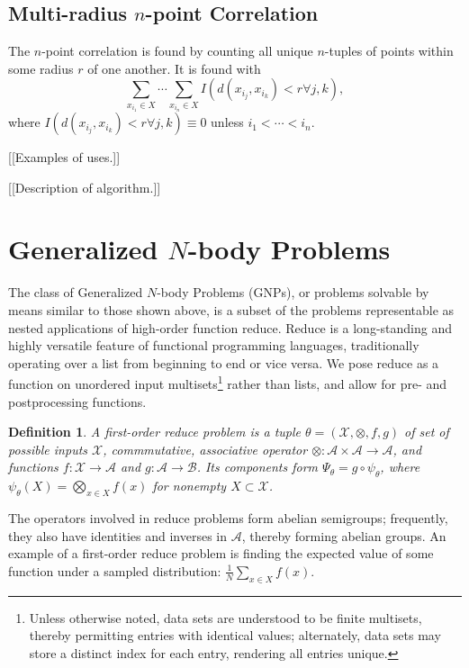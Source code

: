 \documentclass{article}
\newtheorem{definition} {Definition}
\newcommand{\comp}{\mathbin{\circ}}
\begin{document}
\subsection{Multi-radius $n$-point Correlation}

The $n$-point correlation is found by counting all unique $n$-tuples
of points within some radius $r$ of one another.  It is found with
\[
\sum_{x_{i_1} \in X} \cdots \sum_{x_{i_n} \in X} I(d(x_{i_j},x_{i_k}) < r \forall j,k),
\]
where $I(d(x_{i_j},x_{i_k}) < r \forall j,k) \equiv 0$ unless $i_1 <
\cdots < i_n$.

[[Examples of uses.]]

[[Description of algorithm.]]

\section{Generalized $N$-body Problems}

The class of Generalized $N$-body Problems (GNPs), or problems
solvable by means similar to those shown above, is a subset of the
problems representable as nested applications of high-order function
reduce.  Reduce is a long-standing and highly versatile feature of
functional programming languages, traditionally operating over a list
from beginning to end or vice versa.  We pose reduce as a function on
unordered input multisets\footnote{Unless otherwise noted, data sets
are understood to be finite multisets, thereby permitting entries with
identical values; alternately, data sets may store a distinct index
for each entry, rendering all entries unique.} rather than lists, and
allow for pre- and postprocessing functions.
\begin{definition}
  A {\em first-order reduce problem} is a tuple $\theta =
  (\mathcal{X},\otimes,f,g)$ of set of possible inputs $\mathcal{X}$,
  commmutative, associative operator $\otimes \colon \mathcal{A}
  \times \mathcal{A} \to \mathcal{A}$, and functions $f \colon
  \mathcal{X} \to \mathcal{A}$ and $g \colon \mathcal{A} \to
  \mathcal{B}$.  Its components form $\Psi_{\theta} = g \comp
  \psi_{\theta}$, where $\psi_{\theta}(X) = \bigotimes_{x \in X} f(x)$
  for nonempty $X \subset \mathcal{X}$.
\end{definition}
\noindent The operators involved in reduce problems form abelian
semigroups; frequently, they also have identities and inverses in
$\mathcal{A}$, thereby forming abelian groups.  An example of a
first-order reduce problem is finding the expected value of some
function under a sampled distribution: $\frac{1}{N} \sum_{x \in X}
f(x)$.
\end{document}
